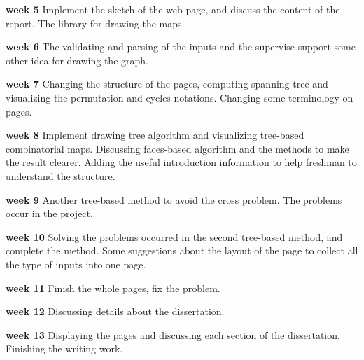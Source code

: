 \textbf{week 5} Implement the sketch of the web page, and discuss the content of the report. The library for drawing the maps.

\textbf{week 6} The validating and parsing of the inputs and the supervise support some other idea for drawing the graph.

\textbf{week 7} Changing the structure of the pages, computing spanning tree and visualizing the permutation and cycles notations. Changing some terminology on pages.

\textbf{week 8} Implement drawing tree algorithm and visualizing tree-based combinatorial maps. Discussing faces-based algorithm and the methods to make the result clearer. Adding the useful introduction information to help freshman to understand the structure.

\textbf{week 9} Another tree-based method to avoid the cross problem. The problems occur in the project.

\textbf{week 10} Solving the problems occurred in the second tree-based method, and complete the method. Some suggestions about the layout of the page to collect all the type of inputs into one page.

\textbf{week 11} Finish the whole pages, fix the problem.

\textbf{week 12} Discussing details about the dissertation.

\textbf{week 13} Displaying the pages and discussing each section of the dissertation. Finishing the writing work.




